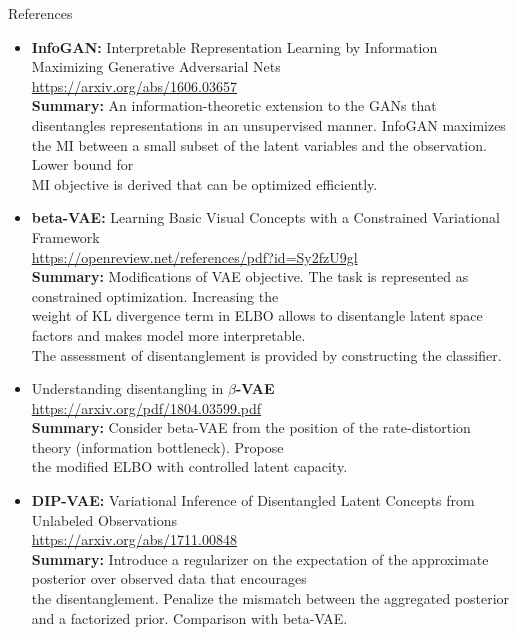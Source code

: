 \documentclass{beamer}
\begin{document}
\begin{frame}{References}
{\tiny
\begin{itemize}
	
	\item \textbf{InfoGAN:} Interpretable Representation Learning by Information Maximizing Generative Adversarial Nets \\
	\href{https://arxiv.org/abs/1606.03657}{https://arxiv.org/abs/1606.03657} \\
	\textbf{Summary:} An information-theoretic extension to the GANs that disentangles representations in an unsupervised manner. InfoGAN maximizes the MI between a small subset of the latent variables and the observation. Lower bound for \\ MI objective is derived that can be optimized efficiently. 
    
    \item \textbf{beta-VAE:} Learning Basic Visual Concepts with a Constrained Variational Framework \\
    \href{https://openreview.net/references/pdf?id=Sy2fzU9gl}{https://openreview.net/references/pdf?id=Sy2fzU9gl} \\
    \textbf{Summary:} Modifications of VAE objective. The task is represented as constrained optimization. Increasing the \\ weight of KL divergence term in ELBO allows to disentangle latent space factors and makes model more interpretable. \\ The assessment of disentanglement is provided by constructing the classifier.
    
    \item Understanding disentangling in \textbf{$\beta$-VAE} \\
    \href{https://arxiv.org/pdf/1804.03599.pdf}{https://arxiv.org/pdf/1804.03599.pdf} \\
    \textbf{Summary:} Consider beta-VAE from the position of the rate-distortion theory (information bottleneck). Propose \\ the modified ELBO with controlled latent capacity.
    
    \item \textbf{DIP-VAE:} Variational Inference of Disentangled Latent Concepts from Unlabeled Observations \\
    \href{https://arxiv.org/abs/1711.00848}{https://arxiv.org/abs/1711.00848} \\
    \textbf{Summary:} Introduce a regularizer on the expectation of the approximate posterior over observed data that encourages \\ the disentanglement. Penalize the mismatch between the aggregated posterior and a factorized prior. Comparison with beta-VAE.
    

\end{itemize}}
\end{frame}
\end{document}
